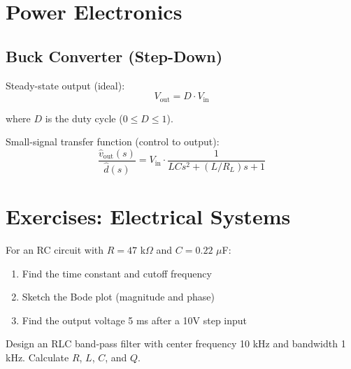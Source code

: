 \section{Power Electronics}
\label{sec:power_electronics}

\subsection{Buck Converter (Step-Down)}



Steady-state output (ideal):
\begin{equation}
V_{\text{out}} = D \cdot V_{\text{in}}
\end{equation}

where $D$ is the duty cycle ($0 \leq D \leq 1$).

Small-signal transfer function (control to output):
\begin{equation}
\frac{\hat{v}_{\text{out}}(s)}{\hat{d}(s)} = V_{\text{in}} \cdot \frac{1}{LCs^2 + (L/R_L)s + 1}
\end{equation}

\section{Exercises: Electrical Systems}

\begin{exercise}
For an RC circuit with $R = 47$ k$\Omega$ and $C = 0.22$ $\mu$F:
\begin{enumerate}[label=(\alph*)]
    \item Find the time constant and cutoff frequency
    \item Sketch the Bode plot (magnitude and phase)
    \item Find the output voltage 5 ms after a 10V step input
\end{enumerate}
\end{exercise}

\begin{exercise}
Design an RLC band-pass filter with center frequency 10 kHz and bandwidth 1 kHz. Calculate $R$, $L$, $C$, and $Q$.
\end{exercise}

